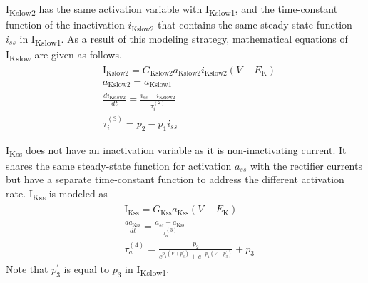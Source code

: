 \documentclass[11pt]{article}
\begin{document}
I\textsubscript{Kslow2} has the same activation variable with I\textsubscript{Kslow1}, and the time-constant function of the inactivation $i_{\mathrm{Kslow2}}$ that contains the same steady-state function $i_{ss}$ in I\textsubscript{Kslow1}. As a result of this modeling strategy, mathematical equations of I\textsubscript{Kslow} are given as follows. 
\begin{align}
    &\mathrm{I}_{\mathrm{Kslow2}} = G_{\mathrm{Kslow2}}a_{\mathrm{Kslow2}}i_{\mathrm{Kslow2}}(V-E_{\mathrm{K}}) \\
    &a_{\mathrm{Kslow2}} = a_{\mathrm{Kslow1}} \\
    &\frac{di_{\mathrm{Kslow2}}}{dt} = \frac{i_{ss}-i_{\mathrm{Kslow2}}}{\tau_{i}^{(2)}} \\
    &\tau_{i}^{(3)} = p_{2} - p_{1}i_{ss}
\end{align}

I\textsubscript{Kss} does not have an inactivation variable as it is non-inactivating current. It shares the same steady-state function for activation $a_{ss}$ with the rectifier currents but have a separate time-constant function to address the different activation rate. I\textsubscript{Kss} is modeled as
\begin{align}
    &\mathrm{I}_{\mathrm{Kss}} = G_{\mathrm{Kss}}a_{\mathrm{Kss}}(V-E_{\mathrm{K}}) \\
    &\frac{da_{\mathrm{Kss}}}{dt} = \frac{a_{ss}-a_{\mathrm{Kss}}}{\tau_{a}^{(3)}} \\
    &\tau_{a}^{(4)}= \frac{p_{2}}{e^{p_{1}(V+p_{3}^\prime)}+e^{-p_{1}(V+p_{3}^\prime)}} + p_{3}
\end{align}
Note that $p_{3}^\prime$ is equal to $p_{3}$ in I\textsubscript{Kslow1}.
\end{document}
